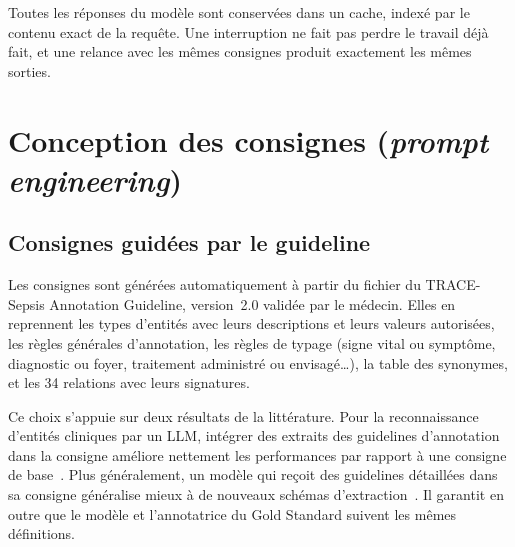 Toutes les réponses du modèle sont conservées dans un cache, indexé par le contenu exact de la requête. Une interruption ne fait pas perdre le travail déjà fait, et une relance avec les mêmes consignes produit exactement les mêmes sorties.

\section{Conception des consignes (\emph{prompt engineering})}\label{sec:c4-prompt}

\subsection{Consignes guidées par le guideline}\label{sec:c4-guideline}

Les consignes sont générées automatiquement à partir du fichier du TRACE-Sepsis Annotation Guideline, version~2.0 validée par le médecin. Elles en reprennent les types d'entités avec leurs descriptions et leurs valeurs autorisées, les règles générales d'annotation, les règles de typage (signe vital ou symptôme, diagnostic ou foyer, traitement administré ou envisagé\dots), la table des synonymes, et les 34 relations avec leurs signatures.

Ce choix s'appuie sur deux résultats de la littérature. Pour la reconnaissance d'entités cliniques par un LLM, intégrer des extraits des guidelines d'annotation dans la consigne améliore nettement les performances par rapport à une consigne de base~\cite{hu2024clinicalner}. Plus généralement, un modèle qui reçoit des guidelines détaillées dans sa consigne généralise mieux à de nouveaux schémas d'extraction~\cite{sainz2024gollie}. Il garantit en outre que le modèle et l'annotatrice du Gold Standard suivent les mêmes définitions.

